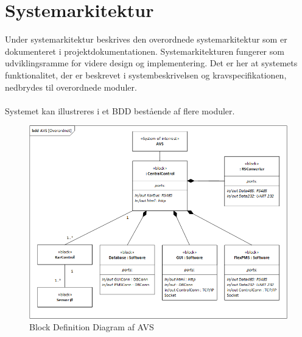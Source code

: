 \section{Systemarkitektur}
Under systemarkitektur beskrives den overordnede systemarkitektur som er dokumenteret i projektdokumentationen. Systemarkitekturen fungerer som udviklingsramme for videre design og implementering. Det er her at systemets funktionalitet, der er beskrevet i systembeskrivelsen og kravspecifikationen, nedbrydes til overordnede moduler.
\\\\
Systemet kan illustreres i et BDD bestående af flere moduler. 
\begin{figure}[H]
	\centering
	\includegraphics[width=1\textwidth]{Projektbeskrivelse/Systemarkitektur/photo/System_BDD}
	\caption{Block Definition Diagram af AVS}
	\label{fig:System_BDD}
\end{figure} 

